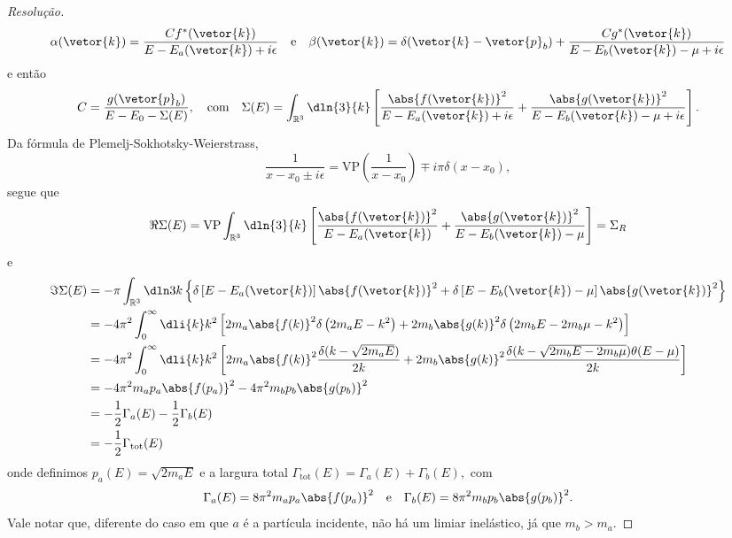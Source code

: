 \begin{proof}[Resolução]
   \begin{equation*}
      \alpha(\vetor{k}) = \frac{C f^*(\vetor{k})}{E - E_a(\vetor{k}) + i \epsilon}
      \quad\text{e}\quad
      \beta(\vetor{k}) = \delta(\vetor{k} - \vetor{p}_b) + \frac{C g^*(\vetor{k})}{E - E_b(\vetor{k}) - \mu + i \epsilon}
   \end{equation*}
   e então
   \begin{equation*}
      C = \frac{g(\vetor{p}_b)}{E - E_0 - \Sigma(E)},
      \quad\text{com}\quad
      \Sigma(E) = \int_{\mathbb{R}^3}\dln{3}{k} \left[\frac{\abs{f(\vetor{k})}^2}{E - E_a(\vetor{k}) + i \epsilon} + \frac{\abs{g(\vetor{k})}^2}{E - E_b(\vetor{k}) - \mu + i \epsilon}\right].
   \end{equation*}
   Da fórmula de Plemelj-Sokhotsky-Weierstrass,
   \begin{equation*}
      \frac{1}{x - x_0 \pm i \epsilon} = \mathrm{VP}\left(\frac{1}{x - x_0}\right) \mp i\pi \delta(x - x_0),
   \end{equation*}
   segue que
   \begin{equation*}
      \Re{\Sigma(E)} = \mathrm{VP}\int_{\mathbb{R}^3}\dln{3}{k} \left[\frac{\abs{f(\vetor{k})}^2}{E - E_a(\vetor{k})} + \frac{\abs{g(\vetor{k})}^2}{E - E_b(\vetor{k}) - \mu}\right] = \Sigma_R
   \end{equation*}
   e
   \begin{align*}
      \Im{\Sigma(E)} &= -\pi \int_{\mathbb{R}^3} \dln3{k} \left\{\delta\left[E - E_a(\vetor{k})\right]\abs{f(\vetor{k})}^2 + \delta\left[E - E_b(\vetor{k}) - \mu\right]\abs{g(\vetor{k})}^2\right\}\\
                     &= - 4\pi^2 \int_{0}^\infty \dli{k} k^2 \left[2m_a\abs{f(k)}^2\delta\left(2m_a E - k^2\right) + 2m_b \abs{g(k)}^2\delta\left(2m_b E - 2m_b \mu - k^2\right)\right]\\
                     &= - 4\pi^2 \int_0^\infty \dli{k} k^2\left[2m_a \abs{f(k)}^2\frac{\delta(k - \sqrt{2m_aE})}{2k} + 2m_b \abs{g(k)}^2\frac{\delta(k - \sqrt{2m_b E - 2m_b \mu}) \theta(E - \mu)}{2k}\right]\\
                     &= -4\pi^2 m_a p_a \abs{f(p_a)}^2 - 4\pi^2 m_b p_b \abs{g(p_b)}^2\\
                     &= - \frac12 \Gamma_a(E) - \frac12 \Gamma_b(E)\\
                     &= - \frac12 \Gamma_{\mathrm{tot}}(E)
   \end{align*}
   onde definimos \(p_a(E) = \sqrt{2m_aE}\) e a largura total \(\Gamma_{\mathrm{tot}}(E) = \Gamma_a(E) + \Gamma_b(E),\) com
   \begin{equation*}
      \Gamma_a(E) = 8\pi^2 m_ap_a\abs{f(p_a)}^2
      \quad\text{e}\quad
      \Gamma_b(E) = 8\pi^2 m_bp_b\abs{g(p_b)}^2.
   \end{equation*}
   Vale notar que, diferente do caso em que \(a\) é a partícula incidente, não há um limiar inelástico, já que \(m_b > m_a.\) 


\end{proof}

